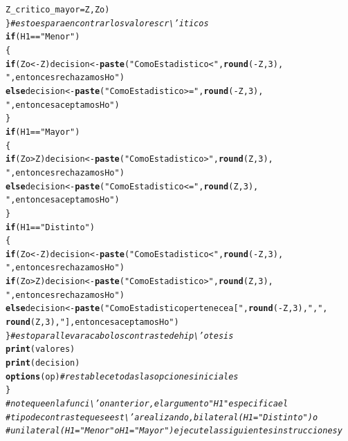 \documentclass[12pt,letterpaper]{article}\usepackage[]{graphicx}\usepackage[]{color}
\makeatletter
\newcommand{\hlnum}[1]{\textcolor[rgb]{0.686,0.059,0.569}{#1}}%
\newcommand{\hlstr}[1]{\textcolor[rgb]{0.192,0.494,0.8}{#1}}%
\newcommand{\hlcom}[1]{\textcolor[rgb]{0.678,0.584,0.686}{\textit{#1}}}%
\newcommand{\hlopt}[1]{\textcolor[rgb]{0,0,0}{#1}}%
\newcommand{\hlstd}[1]{\textcolor[rgb]{0.345,0.345,0.345}{#1}}%
\newcommand{\hlkwa}[1]{\textcolor[rgb]{0.161,0.373,0.58}{\textbf{#1}}}%
\newcommand{\hlkwb}[1]{\textcolor[rgb]{0.69,0.353,0.396}{#1}}%
\newcommand{\hlkwc}[1]{\textcolor[rgb]{0.333,0.667,0.333}{#1}}%
\newcommand{\hlkwd}[1]{\textcolor[rgb]{0.737,0.353,0.396}{\textbf{#1}}}%
\newenvironment{kframe}{%
 \def\at@end@of@kframe{}%
 \ifinner\ifhmode%
  \def\at@end@of@kframe{\end{minipage}}%
  \begin{minipage}{\columnwidth}%
 \fi\fi%
 \def\FrameCommand##1{\hskip\@totalleftmargin \hskip-\fboxsep
 \colorbox{shadecolor}{##1}\hskip-\fboxsep
     \hskip-\linewidth \hskip-\@totalleftmargin \hskip\columnwidth}%
 \MakeFramed {\advance\hsize-\width
   \@totalleftmargin\z@ \linewidth\hsize
   \@setminipage}}%
 {\par\unskip\endMakeFramed%
 \at@end@of@kframe}
\newenvironment{knitrout}{}{} %
\makeatother
\begin{document}
\begin{knitrout}
\begin{kframe}
\begin{alltt}
\hlkwc{Z_critico_mayor} \hlstd{=Z, Zo)}
\hlstd{\}} \hlcom{# esto es para encontrar los valores cr\textbackslash{}'iticos }
\hlkwa{if} \hlstd{(H1} \hlopt{==} \hlstr{"Menor"}\hlstd{)}
\hlstd{\{}
 \hlkwa{if} \hlstd{(Zo} \hlopt{< -}\hlstd{Z) decision} \hlkwb{<-} \hlkwd{paste}\hlstd{(}\hlstr{"Como Estadistico <"}\hlstd{,} \hlkwd{round}\hlstd{(}\hlopt{-}\hlstd{Z,}\hlnum{3}\hlstd{),}
                                \hlstr{", entonces rechazamos Ho"}\hlstd{)}
 \hlkwa{else} \hlstd{decision} \hlkwb{<-} \hlkwd{paste}\hlstd{(}\hlstr{"Como Estadistico>="}\hlstd{,} \hlkwd{round}\hlstd{(}\hlopt{-}\hlstd{Z,}\hlnum{3}\hlstd{),}
                        \hlstr{", entonces aceptamos Ho"}\hlstd{)}
\hlstd{\}}
\hlkwa{if} \hlstd{(H1} \hlopt{==} \hlstr{"Mayor"}\hlstd{)}
\hlstd{\{}
\hlkwa{if} \hlstd{(Zo} \hlopt{>} \hlstd{Z) decision} \hlkwb{<-} \hlkwd{paste}\hlstd{(}\hlstr{"Como Estadistico >"}\hlstd{,} \hlkwd{round}\hlstd{(Z,}\hlnum{3}\hlstd{),}
                              \hlstr{", entonces rechazamos Ho"}\hlstd{)}
\hlkwa{else} \hlstd{decision} \hlkwb{<-} \hlkwd{paste}\hlstd{(}\hlstr{"Como Estadistico <="}\hlstd{,} \hlkwd{round}\hlstd{(Z,}\hlnum{3}\hlstd{),}
                       \hlstr{", entonces aceptamos Ho"}\hlstd{)}
\hlstd{\}}
\hlkwa{if} \hlstd{(H1} \hlopt{==} \hlstr{"Distinto"}\hlstd{)}
\hlstd{\{}
 \hlkwa{if} \hlstd{(Zo} \hlopt{< -}\hlstd{Z) decision} \hlkwb{<-} \hlkwd{paste}\hlstd{(}\hlstr{"Como Estadistico <"}\hlstd{,} \hlkwd{round}\hlstd{(}\hlopt{-}\hlstd{Z,}\hlnum{3}\hlstd{),}
                                \hlstr{", entonces rechazamos Ho"}\hlstd{)}
 \hlkwa{if} \hlstd{(Zo} \hlopt{>} \hlstd{Z) decision} \hlkwb{<-} \hlkwd{paste}\hlstd{(}\hlstr{"Como Estadistico >"}\hlstd{,} \hlkwd{round}\hlstd{(Z,}\hlnum{3}\hlstd{),}
                               \hlstr{", entonces rechazamos Ho"}\hlstd{)}
 \hlkwa{else} \hlstd{decision} \hlkwb{<-} \hlkwd{paste}\hlstd{(}\hlstr{"Como Estadistico pertenece a ["}\hlstd{,} \hlkwd{round}\hlstd{(}\hlopt{-}\hlstd{Z,}\hlnum{3}\hlstd{),} \hlstr{","}\hlstd{,}
\hlkwd{round}\hlstd{(Z,}\hlnum{3}\hlstd{),} \hlstr{"], entonces aceptamos Ho"}\hlstd{)}
\hlstd{\}} \hlcom{# esto para llevar a cabo los contraste de hip\textbackslash{}'otesis }
\hlkwd{print}\hlstd{(valores)}
\hlkwd{print}\hlstd{(decision)}
\hlkwd{options}\hlstd{(op)} \hlcom{# restablece todas las opciones iniciales }
\hlstd{\}}
\hlcom{# note que en la funci\textbackslash{}'on anterior, el argumento "H1" especifica el }
\hlcom{# tipo de contraste que se est\textbackslash{}'a realizando, bilateral (H1= "Distinto") o }
\hlcom{# unilateral (H1= "Menor" o H1= "Mayor") ejecute las siguientes instrucciones y }

\end{alltt}
\end{kframe}
\end{knitrout}
\end{document}
